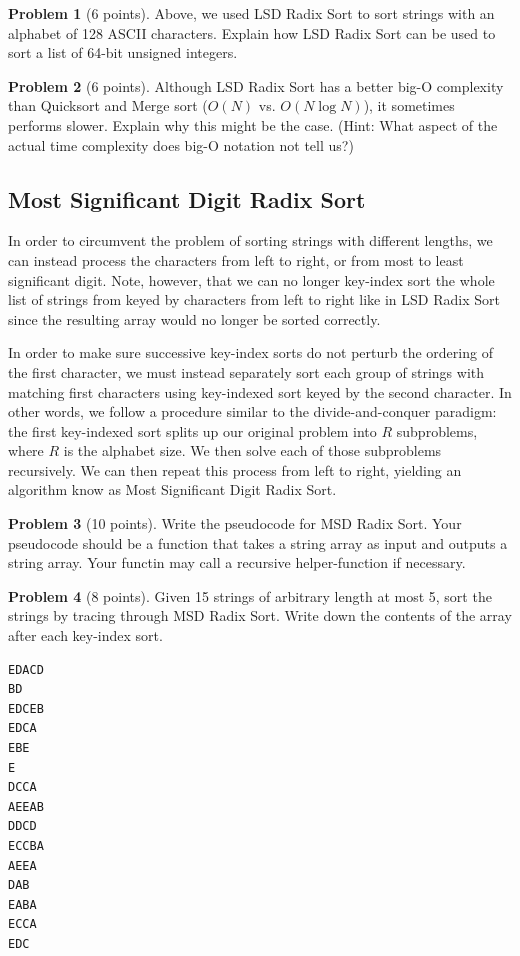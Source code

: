 \documentclass{exam}
\theoremstyle{definition}
\newtheorem{problem}{Problem}[section]
\theoremstyle{definition}
\begin{document}
\begin{problem}[6 points]
    Above, we used LSD Radix Sort to sort strings with an alphabet of 128 ASCII characters. Explain how LSD Radix Sort can be used to sort a list of 64-bit unsigned integers.
\end{problem}

\begin{problem}[6 points]
    Although LSD Radix Sort has a better big-O complexity than Quicksort and Merge sort ($O(N)$ vs. $O(N \log N)$), it sometimes performs slower. Explain why this might be the case. (Hint: What aspect of the actual time complexity does big-O notation not tell us?) 
\end{problem}



\subsection{Most Significant Digit Radix Sort}

In order to circumvent the problem of sorting strings with different lengths, we can instead process the characters from left to right, or from most to least significant digit. Note, however, that we can no longer key-index sort the whole list of strings from keyed by characters from left to right like in LSD Radix Sort since the resulting array would no longer be sorted correctly.

In order to make sure successive key-index sorts do not perturb the ordering of the first character, we must instead separately sort each group of strings with matching first characters using key-indexed sort keyed by the second character. In other words, we follow a procedure similar to the divide-and-conquer paradigm: the first key-indexed sort splits up our original problem into $R$ subproblems, where $R$ is the alphabet size. We then solve each of those subproblems recursively. We can then repeat this process from left to right, yielding an algorithm know as Most Significant Digit Radix Sort.


\begin{problem}[10 points]
    Write the pseudocode for MSD Radix Sort. Your pseudocode should be a function that takes a string array as input and outputs a string array. Your functin  may call a recursive helper-function if necessary. 
\end{problem}

\begin{problem}[8 points]
    Given 15 strings of arbitrary length at most 5, sort the strings by tracing through MSD Radix Sort. Write down the contents of the array after each key-index sort. 
    \begin{verbatim}
EDACD
BD
EDCEB
EDCA
EBE
E
DCCA
AEEAB
DDCD
ECCBA
AEEA
DAB
EABA
ECCA
EDC
    \end{verbatim}
\end{problem}
\end{document}
